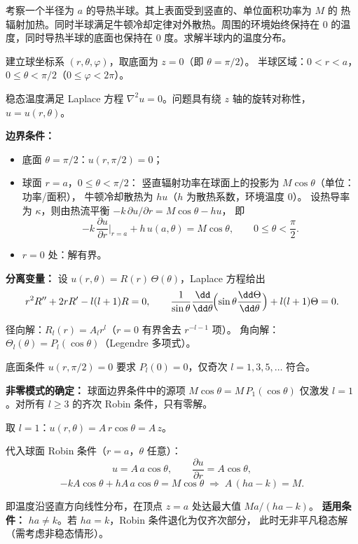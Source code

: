 \begin{question}[导热半球的温度分布]

考察一个半径为 $a$ 的导热半球。其上表面受到竖直的、单位面积功率为 $M$ 的
热辐射加热。同时半球满足牛顿冷却定律对外散热。周围的环境始终保持在 $0$
的温度，同时导热半球的底面也保持在 $0$ 度。求解半球内的温度分布。

\begin{solution}

建立球坐标系 $(r,\theta,\varphi)$，取底面为 $z=0$（即 $\theta=\pi/2$）。
半球区域：$0<r<a$，$0\le\theta<\pi/2$（$0\le\varphi<2\pi$）。

稳态温度满足 Laplace 方程 $\nabla^{2}u=0$。问题具有绕 $z$ 轴的旋转对称性，
$u=u(r,\theta)$。

\textbf{边界条件：}
\begin{itemize}
  \item 底面 $\theta=\pi/2$：$u(r,\pi/2)=0$；
  \item 球面 $r=a$，$0\le\theta<\pi/2$：
  竖直辐射功率在球面上的投影为 $M\cos\theta$（单位：功率/面积），
  牛顿冷却散热为 $h u$（$h$ 为散热系数，环境温度 $0$）。
  设热导率为 $\kappa$，则由热流平衡 $-k\,\partial u/\partial r = M\cos\theta - h u$，
  即
  \[
  -k\,\frac{\partial u}{\partial r}\Big|_{r=a} + h\,u(a,\theta) = M\cos\theta,\qquad 0\le\theta<\frac{\pi}{2}.
  \]
  \item $r=0$ 处：解有界。
\end{itemize}

\textbf{分离变量：} 设 $u(r,\theta)=R(r)\,\Theta(\theta)$，Laplace 方程给出
\[
r^{2}R'' + 2rR' - l(l+1)R = 0,\qquad
\frac{1}{\sin\theta}\frac{\dd}{\dd\theta}\!\Bigl(\sin\theta\frac{\dd\Theta}{\dd\theta}\Bigr) + l(l+1)\Theta = 0.
\]

径向解：$R_{l}(r)=A_{l}r^{l}$（$r=0$ 有界舍去 $r^{-l-1}$ 项）。
角向解：$\Theta_{l}(\theta)=P_{l}(\cos\theta)$（Legendre 多项式）。

底面条件 $u(r,\pi/2)=0$ 要求 $P_{l}(0)=0$，仅奇次 $l=1,3,5,\dots$ 符合。

\textbf{非零模式的确定：} 球面边界条件中的源项 $M\cos\theta = M\,P_{1}(\cos\theta)$
仅激发 $l=1$。对所有 $l\ge 3$ 的齐次 Robin 条件，只有零解。

取 $l=1$：$u(r,\theta) = A\,r\cos\theta = A\,z$。

代入球面 Robin 条件（$r=a$，$\theta$ 任意）：
\[
u = A\,a\cos\theta,\qquad \frac{\partial u}{\partial r} = A\cos\theta,
\]
\[
-kA\cos\theta + hA\,a\cos\theta = M\cos\theta
\;\Longrightarrow\; A\,(h a - k) = M.
\]


即温度沿竖直方向线性分布，在顶点 $z=a$ 处达最大值 $Ma/(h a - k)$。
\textbf{适用条件：} $h a \neq k$。若 $h a = k$，Robin 条件退化为仅齐次部分，
此时无非平凡稳态解（需考虑非稳态情形）。

\end{solution}
\end{question}

\clearpage
